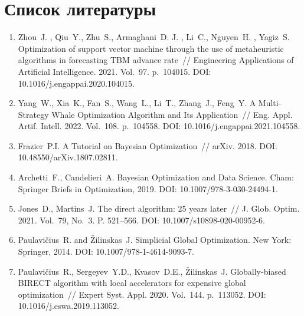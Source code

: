 \documentclass[a4paper,12pt,russian]{article}
\begin{document}
\section*{Список литературы}
\begin{enumerate}

\item \label{rfa:rulit:Zhou2021}
Zhou~J. , Qiu~Y.,  Zhu~S., Armaghani~D. J. , Li~C., Nguyen~H. , Yagiz~S. Optimization of support vector machine through the use of metaheuristic algorithms in forecasting {TBM} advance rate~// Engineering Applications of Artificial Intelligence. 2021. Vol.~97. p.~104015.  DOI: 10.1016/j.engappai.2020.104015.

\item \label{rfa:rulit:Yang2022}
Yang~W., Xia~K., Fan~S., Wang~L., Li~T., Zhang~J., Feng~Y. A Multi-Strategy Whale Optimization Algorithm and Its Application~// Eng. Appl. Artif. Intell. 2022. Vol.~108. p.~104558. DOI: 10.1016/j.engappai.2021.104558.

\item \label{rfa:rulit:Frazier2018}
Frazier~P.I. A Tutorial on Bayesian Optimization~// arXiv. 2018. DOI: 10.48550/arXiv.1807.02811.

\item \label{rfa:rulit:Archetti2019}
Archetti~F., Candelieri~A. Bayesian Optimization and Data Science. Cham: Springer Briefs in Optimization, 2019. DOI: 10.1007/978-3-030-24494-1.

\item \label{rfa:rulit:Jones2021}
Jones~D., Martins~J. The direct algorithm: 25 years later~// J. Glob. Optim. 2021. Vol.~79, No.~3. P. 521--566. DOI: 10.1007/s10898-020-00952-6.

\item \label{rfa:rulit:PaulaviciusZilinskas2014}
Paulavi{\v c}ius~R. and {\v Z}ilinskas~J. Simplicial Global Optimization. New York: Springer, 2014. DOI: 10.1007/978-1-4614-9093-7.

\item \label{rfa:rulit:Birect2020}
Paulavi{\v c}ius~R., Sergeyev~Y.D., Kvasov~D.E., {\v Z}ilinskas~J. Globally-biased {BIRECT} algorithm with local accelerators for expensive global optimization~// Expert Syst. Appl. 2020. Vol.~144. p.~113052. DOI: 10.1016/j.eswa.2019.113052.


\end{enumerate}
\end{document}
